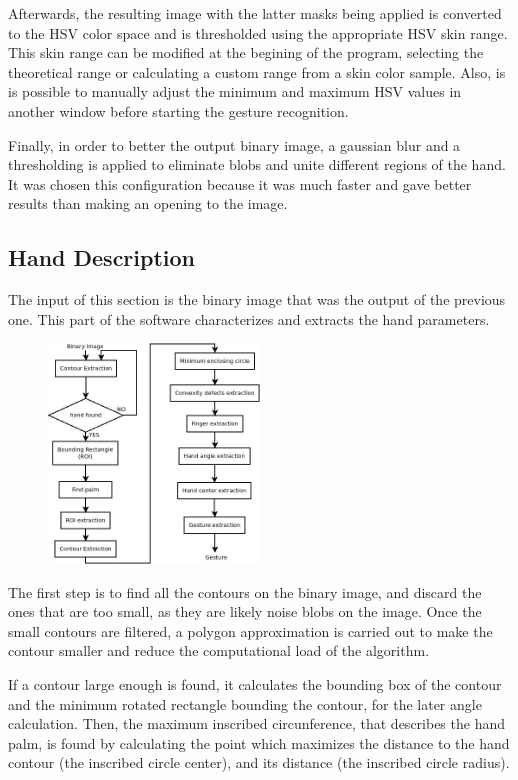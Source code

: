 Afterwards, the resulting image with the latter masks being applied is converted to the HSV color space and is thresholded using the appropriate HSV skin range.
This skin range can be modified at the begining of the program, selecting the theoretical range or calculating a custom range from a skin color sample. Also, is is possible to manually adjust the minimum and maximum HSV values in another window before starting the gesture recognition. 

Finally, in order to better the output binary image, a gaussian blur and a thresholding is applied to eliminate blobs and unite different regions of the hand. It was chosen this configuration because it was much faster and gave better results than making an opening to the image. 

 
\subsection{Hand Description}

The input of this section is the binary image that was the output of the previous one. This part of the software characterizes and extracts the hand parameters. 

\begin{figure}[H]
	\centering
	\includegraphics[width=0.5\textwidth]{../hand_description.jpeg} 
\end{figure}


The first step is to find all the contours on the binary image, and discard the ones that are too small, as they are likely noise blobs on the image. Once the small contours are filtered, a polygon approximation is carried out to make the contour smaller and reduce the computational load of the algorithm.

If a contour large enough is found, it calculates the bounding box of the contour and the minimum rotated rectangle bounding the contour, for the later angle calculation. Then, the maximum inscribed circunference, that describes the hand palm, is found by calculating the point which maximizes the distance to the hand contour (the inscribed circle center), and its distance (the inscribed circle radius).

